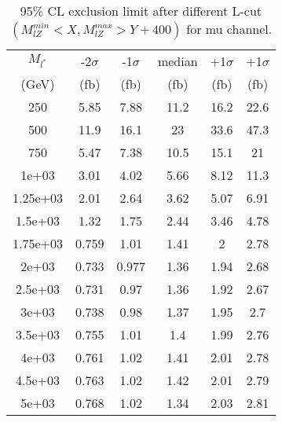 \documentclass[]{article}
\begin{document}
\begin{table}
\begin{center}
\begin{tabular}{cccccc}
\hline 
\hline 
$M_{l^*}$ & -2$\sigma$ & -1$\sigma$ & median & +1$\sigma$ & +1$\sigma$\\ 
(GeV) & (fb) & (fb) & (fb) & (fb) & (fb)  \\ 
\hline 
\hline 
250 & 5.85 & 7.88 & 11.2 & 16.2 & 22.6\\
500 & 11.9 & 16.1 & 23 & 33.6 & 47.3\\
750 & 5.47 & 7.38 & 10.5 & 15.1 & 21\\
1e+03 & 3.01 & 4.02 & 5.66 & 8.12 & 11.3\\
1.25e+03 & 2.01 & 2.64 & 3.62 & 5.07 & 6.91\\
1.5e+03 & 1.32 & 1.75 & 2.44 & 3.46 & 4.78\\
1.75e+03 & 0.759 & 1.01 & 1.41 & 2 & 2.78\\
2e+03 & 0.733 & 0.977 & 1.36 & 1.94 & 2.68\\
2.5e+03 & 0.731 & 0.97 & 1.36 & 1.92 & 2.67\\
3e+03 & 0.738 & 0.98 & 1.37 & 1.95 & 2.7\\
3.5e+03 & 0.755 & 1.01 & 1.4 & 1.99 & 2.76\\
4e+03 & 0.761 & 1.02 & 1.41 & 2.01 & 2.78\\
4.5e+03 & 0.763 & 1.02 & 1.42 & 2.01 & 2.79\\
5e+03 & 0.768 & 1.02 & 1.34 & 2.03 & 2.81\\
\hline 
\end{tabular}
\caption{95\% CL exclusion limit after different L-cut $(M_{lZ}^{min} < X, M_{lZ}^{max} > Y + 400)$ for mu channel.}
\label{tab:limit_muon}
\end{center}
\end{table}
\end{document}
